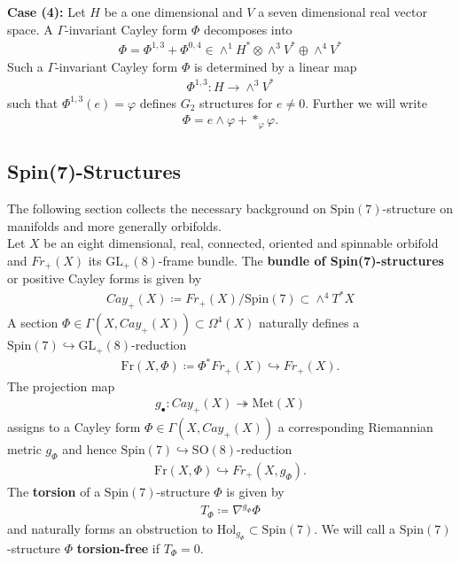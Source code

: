 \documentclass[psamsfonts]{amsart}
\theoremstyle{plain}
\theoremstyle{definition}{
\newtheorem{defi}{Definition}[section]
\newtheorem{ass}{Assumption}
\newtheorem*{nota}{Notation}}
\theoremstyle{remark}{
\newtheorem{rem}{Remark}
\newtheorem{ex}{Example}}
\theoremstyle{plain}{
\newtheorem{thm}{Theorem}[section]
\newtheorem{lem}{Lemma}[section]
\newtheorem{cor}{Corollary}[section]
\newtheorem{prop}{Proposition}[section]
\newtheorem{con}{Conjecture}[section]}
\newcommand{\m}[1]{{\mathrm{#1}}}
\begin{document}
\textbf{Case (4): } Let $H$ be a one dimensional and $V$ a seven dimensional real vector space. A $\Gamma$-invariant Cayley form $\Phi$ decomposes into 
\begin{align*}
    \Phi=\Phi^{1,3}+\Phi^{0,4}\in\wedge^1 H^*\otimes\wedge^3V^*\oplus\wedge^4 V^*
\end{align*}
Such a $\Gamma$-invariant Cayley form $\Phi$ is determined by a linear map
\begin{align*}
    \Phi^{1,3}:H\rightarrow \wedge^3 V^*
\end{align*}
such that $\Phi^{1,3}(e)=\varphi$ defines $G_2$ structures for $e\neq0$. Further we will write 
\begin{align*}
    \Phi=e\wedge\varphi+*_{\varphi}\varphi.
\end{align*}

\subsection{Spin(7)-Structures}
\label{Spin(7)-Structures}

The following section collects the necessary background on $\m{Spin}(7)$-structure on manifolds and more generally orbifolds.\\  

Let $X$ be an eight dimensional, real, connected, oriented and spinnable orbifold and $Fr_+(X)$ its $\m{GL}_+(8)$-frame bundle. The \textbf{bundle of Spin(7)-structures} or positive Cayley forms is given by 
\begin{align*}
    Cay_+(X)\coloneqq Fr_+(X)/\m{Spin}(7)\subset \wedge^4 T^* X
\end{align*}
A section $\Phi\in \Gamma(X,Cay_+(X))\subset \Omega^4(X)$ naturally defines a $\m{Spin}(7)\hookrightarrow \m{GL}_+(8)$-reduction 
\begin{align*}
    \m{Fr}(X,\Phi)\coloneqq \Phi^*Fr_+(X)\hookrightarrow Fr_+(X).
\end{align*}
The projection map 
\begin{align*}
    g_\bullet\colon Cay_+(X)\twoheadrightarrow \m{Met}(X)
\end{align*}
assigns to a Cayley form $\Phi\in\Gamma(X,Cay_+(X))$ a corresponding Riemannian metric $g_\Phi$ and hence $\m{Spin}(7)\hookrightarrow \m{SO}(8)$-reduction 
\begin{align*}
    \m{Fr}(X,\Phi)\hookrightarrow Fr_+(X,g_\Phi).
\end{align*}
The \textbf{torsion} of a $\m{Spin}(7)$-structure $\Phi$ is given by 
\begin{align*}
    T_\Phi\coloneqq \nabla^{g_\Phi}\Phi
\end{align*} 
and naturally forms an obstruction to $\m{Hol}_{g_\Phi}\subset \m{Spin}(7)$. We will call a $\m{Spin}(7)$-structure $\Phi$ \textbf{torsion-free} if $T_\Phi=0$.
\end{document}
